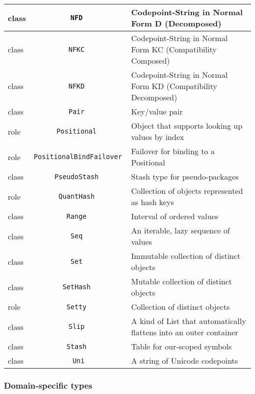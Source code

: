 \documentclass[17pt,english]{extarticle}
\providecommand{\tabularnewline}{\\}
\begin{document}
\begin{longtable}{|>{\centering}p{}|c|>{\centering}p{}}
\hline 
\hline 
class  &
\texttt{NFD } &
Codepoint-String in Normal Form D (Decomposed)\tabularnewline
\hline 
\hline 
class  &
\texttt{NFKC } &
Codepoint-String in Normal Form KC (Compatibility Composed)\tabularnewline
\hline 
\hline 
class  &
\texttt{NFKD } &
Codepoint-String in Normal Form KD (Compatibility Decomposed)\tabularnewline
\hline 
\hline 
class  &
\texttt{Pair } &
Key/value pair\tabularnewline
\hline 
\hline 
role  &
\texttt{Positional } &
Object that supports looking up values by index\tabularnewline
\hline 
\hline 
role  &
\texttt{PositionalBindFailover } &
Failover for binding to a Positional\tabularnewline
\hline 
\hline 
class  &
\texttt{PseudoStash } &
Stash type for pseudo-packages\tabularnewline
\hline 
\hline 
role  &
\texttt{QuantHash } &
Collection of objects represented as hash keys\tabularnewline
\hline 
\hline 
class  &
\texttt{Range } &
Interval of ordered values\tabularnewline
\hline 
\hline 
class  &
\texttt{Seq } &
An iterable, lazy sequence of values\tabularnewline
\hline 
\hline 
class  &
\texttt{Set } &
Immutable collection of distinct objects\tabularnewline
\hline 
\hline 
class  &
\texttt{SetHash } &
Mutable collection of distinct objects\tabularnewline
\hline 
\hline 
role  &
\texttt{Setty } &
Collection of distinct objects\tabularnewline
\hline 
\hline 
class  &
\texttt{Slip } &
A kind of List that automatically flattens into an outer container\tabularnewline
\hline 
\hline 
class  &
\texttt{Stash } &
Table for \textquotedbl{}our\textquotedbl{}-scoped symbols\tabularnewline
\hline 
\hline 
class &
\texttt{Uni} &
A string of Unicode codepoints\tabularnewline
\hline 
\end{longtable}


\subsubsection*{Domain-specific types}
\end{document}
